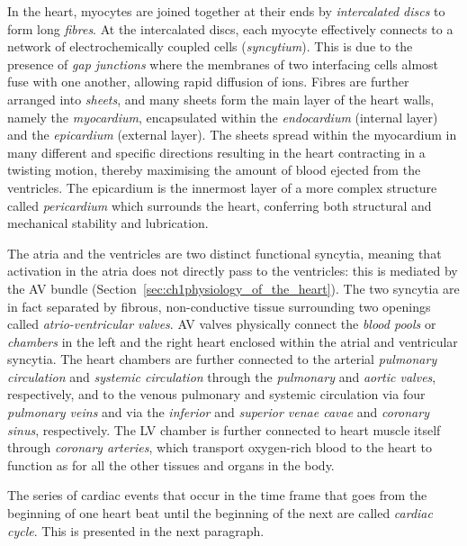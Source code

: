 \vspace{0.2cm}
In the heart, myocytes are joined together at their ends by \textit{intercalated discs} to form long \textit{fibres}. At the intercalated discs, each myocyte effectively connects to a network of electrochemically coupled cells (\textit{syncytium}). This is due to the presence of \textit{gap junctions} where the membranes of two interfacing cells almost fuse with one another, allowing rapid diffusion of ions. Fibres are further arranged into \textit{sheets}, and many sheets form the main layer of the heart walls, namely the \textit{myocardium}, encapsulated within the \textit{endocardium} (internal layer) and the \textit{epicardium} (external layer). The sheets spread within the myocardium in many different and specific directions resulting in the heart contracting in a twisting motion, thereby maximising the amount of blood ejected from the ventricles. The epicardium is the innermost layer of a more complex structure called \textit{pericardium} which surrounds the heart, conferring both structural and mechanical stability and lubrication.

\vspace{0.2cm}
The atria and the ventricles are two distinct functional syncytia, meaning that activation in the atria does not directly pass to the ventricles: this is mediated by the AV bundle (Section~\ref{sec:ch1physiology_of_the_heart}). The two syncytia are in fact separated by fibrous, non-conductive tissue surrounding two openings called \textit{atrio-ventricular valves}. AV valves physically connect the \textit{blood pools} or \textit{chambers} in the left and the right heart enclosed within the atrial and ventricular syncytia. The heart chambers are further connected to the arterial \textit{pulmonary circulation} and \textit{systemic circulation} through the \textit{pulmonary} and \textit{aortic valves}, respectively, and to the venous pulmonary and systemic circulation via four \textit{pulmonary veins} and via the \textit{inferior} and \textit{superior venae cavae} and \textit{coronary sinus}, respectively. The LV chamber is further connected to heart muscle itself through \textit{coronary arteries}, which transport oxygen-rich blood to the heart to function as for all the other tissues and organs in the body. 

\vspace{0.2cm}
The series of cardiac events that occur in the time frame that goes from the beginning of one heart beat until the beginning of the next are called \textit{cardiac cycle}. This is presented in the next paragraph.


